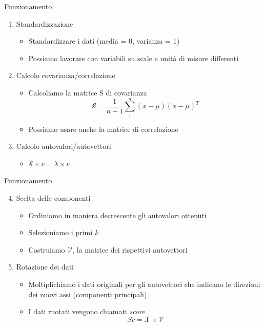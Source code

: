\documentclass[xcolor={dvipsnames}]{beamer}%
\begin{document}
		\begin{frame}{Funzionamento}
			\begin{enumerate}
				\item Standardizzazione
				\begin{itemize}
					\footnotesize
					\item Standardizzare i dati (media = 0, varianza = 1)
					\item Possiamo lavorare con variabili su scale e unità di misure differenti
				\end{itemize}
				\item Calcolo covarianza/correlazione
				\begin{itemize}
					\footnotesize
					\item Calcoliamo la matrice S di covarianza $$\mathcal{S} = \frac{1}{n-1} \sum_{1}^{n} (x-\mu)(x-\mu)^T$$
					\item Possiamo usare anche la matrice di correlazione
				\end{itemize}
				\item Calcolo autovalori/autovettori 
				\begin{itemize}
					\item $\mathcal{S} \times v = \lambda \times v$
				\end{itemize}
			\end{enumerate}
		\end{frame}
	
		\begin{frame}{Funzionamento}
			\begin{enumerate}
				\setcounter{enumi}{3}
				\item Scelta delle componenti
				\begin{itemize}
					\footnotesize
					\item Ordiniamo in maniera decrescente gli autovalori ottenuti
					\item Selezioniamo i primi \emph{k}
					\item Costruiamo $\mathcal{V}$, la matrice dei rispettivi autovettori
				\end{itemize}
				\item Rotazione dei dati
				\begin{itemize}
					\footnotesize
					\item Moltiplichiamo i dati originali per gli autovettori che indicano le direzioni dei nuovi assi (componenti principali) 
					\item I dati ruotati vengono chiamati \emph{score} $$Sc = \mathcal{X} \times \mathcal{V}$$
				\end{itemize}
			\end{enumerate}
		\end{frame}
	
\end{document}
